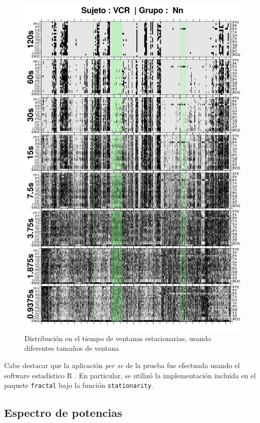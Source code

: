 \begin{figure}
\centering
\includegraphics[width=0.7\linewidth]
{./img_ejemplos/VCNNS1_comp_est_.png}
\caption{Distribución en el tiempo de ventanas estacionarias, usando diferentes tamaños
de ventana}
\label{comp_VCR}
\end{figure}

%


Cabe destacar que la aplicación \textit{per se} de la prueba fue efectuada usando el software 
estadístico R \cite{R_citar}. En particular, se utilizó la implementación 
incluida en el paquete \texttt{fractal} \cite{R_fractal} bajo la función \texttt{stationarity}.

\subsection{Espectro de potencias}

